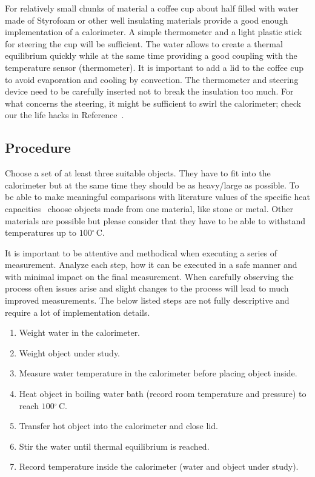 \documentclass[10pt,aps,twocolumn,secnumarabic,balancelastpage,amsmath,amssymb,nofootinbib,floatfix]{revtex4}
\newcommand{\C}{\ensuremath{^\circ\,\text{C}}}
\begin{document}
For relatively small chunks of material a coffee cup about half filled with water made of Styrofoam or other well insulating materials provide a good enough implementation of a calorimeter. A simple thermometer and a light plastic stick for steering the cup will be sufficient. The water allows to create a thermal equilibrium quickly while at the same time providing a good coupling with the temperature sensor (thermometer). It is important to add a lid to the coffee cup to avoid evaporation and cooling by convection. The thermometer and steering device need to be carefully inserted not to break the insulation too much. For what concerns the steering, it might be sufficient to swirl the calorimeter; check our the life hacks in Reference~\cite{MixingWithoutSpoon}.

\subsection{Procedure}

Choose a set of at least three suitable objects. They have to fit into the calorimeter but at the same time they should be as heavy/large as possible. To be able to make meaningful comparisons with literature values of the specific heat capacities~\cite{SpecificHeatCapacities} choose objects made from one material, like stone or metal. Other materials are possible but please consider that they have to be able to withstand temperatures up to $100\C$.

It is important to be attentive and methodical when executing a series of measurement. Analyze each step, how it can be executed in a safe manner and with minimal impact on the final measurement. When carefully observing the process often issues arise and slight changes to the process will lead to much improved measurements. The below listed steps are not fully descriptive and require a lot of implementation details.

\begin{enumerate}
  \item Weight water in the calorimeter.
  \item Weight object under study.
  \item Measure water temperature in the calorimeter before placing object inside.
  \item Heat object in boiling water bath (record room temperature and pressure) to reach $100\C$.
  \item Transfer hot object into the calorimeter and close lid.
  \item Stir the water until thermal equilibrium is reached.
  \item Record temperature inside the calorimeter (water and object under study).
\end{enumerate}
\end{document}
